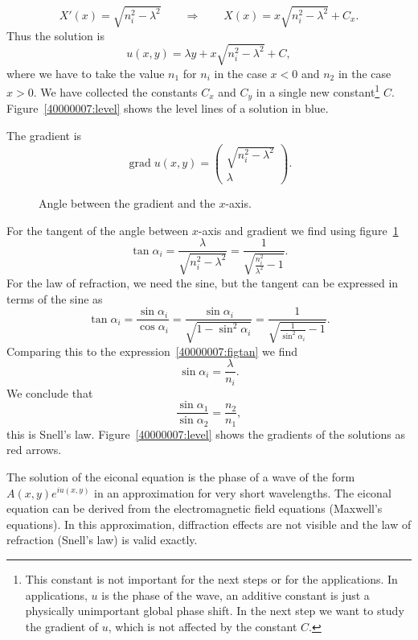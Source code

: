 \begin{loesung}
\begin{teilaufgaben}
\[
X'(x)=\sqrt{n_i^2-\lambda^2}
\qquad
\Rightarrow
\qquad
X(x)=x\sqrt{n_i^2-\lambda^2} + C_x.
\]
Thus the solution is
\[
u(x,y)=\lambda y + x\sqrt{n_i^2-\lambda^2} + C,
\]
where we have to take the value $n_1$ for $n_i$ in the case $x<0$
and $n_2$ in the case $x>0$.
We have collected the constants
$C_x$ and $C_y$ in a single new constant\footnote{This constant
is not important for the next steps or for the applications.
In applications, $u$ is the phase of the wave, an additive constant
is just a physically unimportant global phase shift.
In the next step we want to study the gradient of $u$, which is not
affected by the constant $C$.}
$C$.
Figure~\ref{40000007:level} shows the level lines of a solution in blue.
\item
The gradient is
\[
\operatorname{grad}u(x,y)
=
\begin{pmatrix}
\sqrt{n_i^2-\lambda^2}\\
\lambda
\end{pmatrix}.
\]
\begin{figure}
\centering
{}
\caption{Angle between the gradient and the $x$-axis.
\label{40000007:fig}}
\end{figure}
For the tangent of the angle between $x$-axis and gradient we find
using figure~\ref{40000007:fig}
\begin{equation}
\tan\alpha_i
=
\frac{\lambda}{\sqrt{n_i^2-\lambda^2}}
=
\frac1{\sqrt{\frac{n_i^2}{\lambda^2}-1}}.
\label{40000007:figtan}
\end{equation}
For the law of refraction, we need the sine, but the tangent can be
expressed in terms of the sine as
\[
\tan\alpha_i
=
\frac{\sin\alpha_i}{\cos\alpha_i}
=
\frac{\sin\alpha_i}{\sqrt{1-\sin^2\alpha_i}}
=
\frac{1}{\sqrt{\frac{1}{\sin^2\alpha_i}-1}}.
\]
Comparing this to the expression~\eqref{40000007:figtan}
we find
\[
\sin\alpha_i=\frac{\lambda}{n_i}.
\]
We conclude that
\[
\frac{ \sin\alpha_1}{\sin\alpha_2}=\frac{n_2}{n_1},
\]
this is Snell's law.
Figure~\ref{40000007:level} shows the gradients of the solutions
as red arrows.
\qedhere
\end{teilaufgaben}
\end{loesung}

\begin{diskussion}
The solution of the eiconal equation is the phase of a wave of the
form
$A(x,y)e^{iu(x,y)}$ in an approximation for very short wavelengths.
The eiconal equation can be derived from the electromagnetic field
equations (Maxwell's equations).
In this approximation, diffraction effects are not visible and the
law of refraction (Snell's law) is valid exactly.
\end{diskussion}
